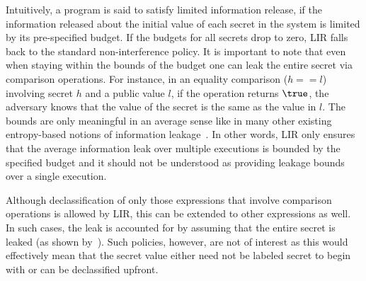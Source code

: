 Intuitively, a program is said to satisfy limited information release, if
the information released about the initial value of each secret in the system is
limited by its pre-specified budget. If the budgets for all secrets
drop to zero, LIR falls back to the standard non-interference policy. It is
important to note that even when staying within the bounds of the budget one can
leak the entire secret via comparison operations. For instance, in an equality
comparison ($h==l$) involving secret $h$ and a public value $l$, if the
operation returns $\true$, the adversary knows that the value of the secret is
the same as the value in $l$. The bounds are only meaningful in an
average sense like in many other existing entropy-based notions of information
leakage~\cite{denning82, clark, smith2009}. In other words, LIR only
ensures that the average information 
leak over multiple executions is bounded by the specified budget and it should
not be understood as providing leakage bounds over a single execution.

Although declassification of only those expressions that involve
comparison operations is allowed by LIR, this can be extended to other
expressions as well. In such cases, the leak is accounted for by
assuming that the entire secret is leaked (as shown
by~\cite{clark}). Such policies, however, are not of interest as this
would effectively mean that the secret value either need not be
labeled secret to begin with or can be declassified upfront. 






